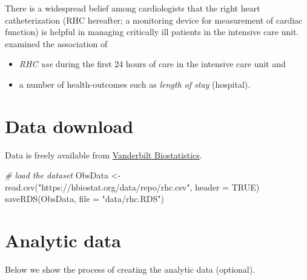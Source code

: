 \documentclass[
]{book}
\newenvironment{Shaded}{\begin{snugshade}}{\end{snugshade}}
\newcommand{\AttributeTok}[1]{\textcolor[rgb]{0.77,0.63,0.00}{#1}}
\newcommand{\CommentTok}[1]{\textcolor[rgb]{0.56,0.35,0.01}{\textit{#1}}}
\newcommand{\ConstantTok}[1]{\textcolor[rgb]{0.00,0.00,0.00}{#1}}
\newcommand{\FunctionTok}[1]{\textcolor[rgb]{0.00,0.00,0.00}{#1}}
\newcommand{\NormalTok}[1]{#1}
\newcommand{\OtherTok}[1]{\textcolor[rgb]{0.56,0.35,0.01}{#1}}
\newcommand{\StringTok}[1]{\textcolor[rgb]{0.31,0.60,0.02}{#1}}
\providecommand{\tightlist}{%
  \setlength{\itemsep}{0pt}\setlength{\parskip}{0pt}}
\begin{document}
There is a widespread belief among cardiologists that the right heart catheterization (RHC hereafter; a monitoring device for measurement of cardiac function) is helpful in managing critically ill patients in the intensive care unit. \citet{connors1996effectiveness} examined the association of

\begin{itemize}
\tightlist
\item
  \emph{RHC use} during the first 24 hours of care in the intensive care unit and
\item
  a number of health-outcomes such as \emph{length of stay} (hospital).
\end{itemize}

\hypertarget{data-download}{%
\section{Data download}\label{data-download}}

\begin{rmdcomment}
Data is freely available from
\href{https://hbiostat.org/data/}{Vanderbilt Biostatistics}.
\end{rmdcomment}

\begin{Shaded}
\begin{Highlighting}[]
\CommentTok{\# load the dataset}
\NormalTok{ObsData }\OtherTok{\textless{}{-}} \FunctionTok{read.csv}\NormalTok{(}\StringTok{"https://hbiostat.org/data/repo/rhc.csv"}\NormalTok{, }\AttributeTok{header =} \ConstantTok{TRUE}\NormalTok{)}
\FunctionTok{saveRDS}\NormalTok{(ObsData, }\AttributeTok{file =} \StringTok{"data/rhc.RDS"}\NormalTok{)}
\end{Highlighting}
\end{Shaded}

\hypertarget{analytic-data}{%
\section{Analytic data}\label{analytic-data}}

Below we show the process of creating the analytic data (optional).
\end{document}
